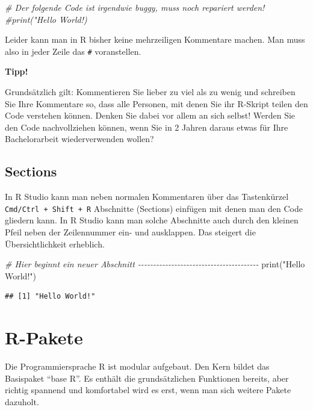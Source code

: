 \documentclass[
]{book}
\newenvironment{Shaded}{\begin{snugshade}}{\end{snugshade}}
\newcommand{\CommentTok}[1]{\textcolor[rgb]{0.56,0.35,0.01}{\textit{#1}}}
\newcommand{\FunctionTok}[1]{\textcolor[rgb]{0.00,0.00,0.00}{#1}}
\newcommand{\NormalTok}[1]{#1}
\newcommand{\StringTok}[1]{\textcolor[rgb]{0.31,0.60,0.02}{#1}}
\begin{document}
\begin{Shaded}
\begin{Highlighting}[]
\CommentTok{\# Der folgende Code ist irgendwie buggy, muss noch repariert werden! }
\CommentTok{\#print("Hello World!)}
\end{Highlighting}
\end{Shaded}

Leider kann man in R bisher keine mehrzeiligen Kommentare machen. Man muss also in jeder Zeile das \texttt{\#} voranstellen.

\textbf{Tipp!}

Grundsätzlich gilt: Kommentieren Sie lieber zu viel als zu wenig und schreiben Sie Ihre Kommentare so, dass alle Personen, mit denen Sie ihr R-Skript teilen den Code verstehen können. Denken Sie dabei vor allem an sich selbst! Werden Sie den Code nachvollziehen können, wenn Sie in 2 Jahren daraus etwas für Ihre Bachelorarbeit wiederverwenden wollen?

\hypertarget{sections}{%
\subsection{Sections}\label{sections}}

In R Studio kann man neben normalen Kommentaren über das Tastenkürzel \texttt{Cmd/Ctrl\ +\ Shift\ +\ R} Abschnitte (Sections) einfügen mit denen man den Code gliedern kann. In R Studio kann man solche Abschnitte auch durch den kleinen Pfeil neben der Zeilennummer ein- und ausklappen. Das steigert die Übersichtlichkeit erheblich.

\begin{Shaded}
\begin{Highlighting}[]
\CommentTok{\# Hier beginnt ein neuer Abschnitt {-}{-}{-}{-}{-}{-}{-}{-}{-}{-}{-}{-}{-}{-}{-}{-}{-}{-}{-}{-}{-}{-}{-}{-}{-}{-}{-}{-}{-}{-}{-}{-}{-}{-}{-}{-}{-}{-}{-}{-}}
\FunctionTok{print}\NormalTok{(}\StringTok{"Hello World!"}\NormalTok{)}
\end{Highlighting}
\end{Shaded}

\begin{verbatim}
## [1] "Hello World!"
\end{verbatim}

\hypertarget{r-pakete}{%
\section{R-Pakete}\label{r-pakete}}

Die Programmiersprache R ist modular aufgebaut. Den Kern bildet das Basispaket ``base R''. Es enthält die grundsätzlichen Funktionen bereits, aber richtig spannend und komfortabel wird es erst, wenn man sich weitere Pakete dazuholt.
\end{document}
